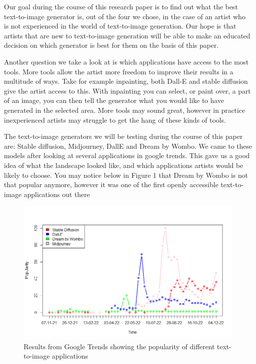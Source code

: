 \documentclass[]{report}
\begin{document}
Our goal during the course of this research paper is to find out what the best text-to-image generator is, out of the four we chose, in the case of an artist who is not experienced in the world of text-to-image generation. Our hope is that artists that are new to text-to-image generation will be able to make an educated decision on which generator is best for them on the basis of this paper.

Another question we take a look at is which applications have access to the most tools. More tools allow the artist more freedom to improve their results in a multitude of ways. Take for example inpainting, both Dall-E and stable diffusion give the artist access to this. With inpainting you can select, or paint over, a part of an image, you can then tell the generator what you would like to have generated in the selected area. More tools may sound great, however in practice inexperienced artists may struggle to get the hang of these kinds of tools.

\pagebreak

The text-to-image generators we will be testing during the course of this paper are: Stable diffusion, Midjourney, DallE and Dream by Wombo. We came to these models after looking at several applications in google trends. This gave us a good idea of what the landscape looked like, and which applications artists would be likely to choose. You may notice below in Figure 1 that Dream by Wombo is not that popular anymore, however it was one of the first openly accessible text-to-image applications out there

\begin{figure}[!htb]
	\centering
	\includegraphics[width=1\linewidth]{TrendsPlotWithLegend}
	\caption{Results from Google Trends showing the popularity of different text-to-image applications}
	\label{fig:TrendsPlotWithLegend}
\end{figure}
\end{document}
